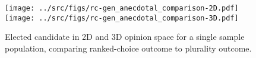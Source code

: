 \begin{figure*}
\texttt{[image: ../src/figs/rc-gen\_anecdotal\_comparison-2D.pdf]}\vspace{-4mm}
\texttt{[image: ../src/figs/rc-gen\_anecdotal\_comparison-3D.pdf]}
\caption{Elected candidate in 2D and 3D opinion space for a single sample population, comparing ranked-choice outcome to plurality outcome.}
\label{fig:plurality_vs_rc_anecdotal}
\end{figure*}
